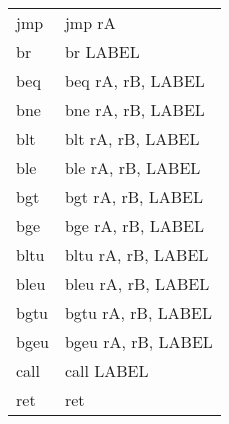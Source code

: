 \documentclass[10pt]{article}
\begin{document}
{\begin{tabular}{l|l}
  jmp & jmp rA\\
  br & br LABEL\\
  beq & beq rA, rB, LABEL\\
  bne & bne rA, rB, LABEL\\
  blt & blt rA, rB, LABEL\\
  ble & ble rA, rB, LABEL\\
  bgt & bgt rA, rB, LABEL\\
  bge & bge rA, rB, LABEL\\
  bltu & bltu rA, rB, LABEL\\
  bleu & bleu rA, rB, LABEL\\
  bgtu & bgtu rA, rB, LABEL\\
  bgeu & bgeu rA, rB, LABEL\\
  call & call LABEL\\
  ret & ret\\
\end{tabular}
}
\end{document}
